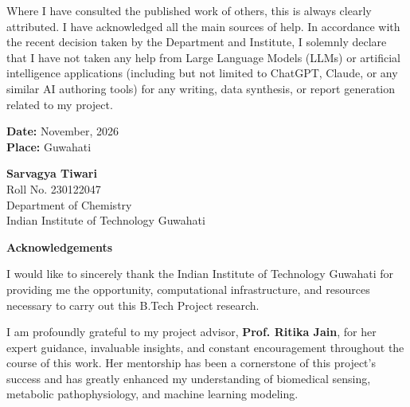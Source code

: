 \documentclass[12pt,a4paper,oneside]{report}
\begin{document}
\vspace{0.5cm}
\noindent
Where I have consulted the published work of others, this is always clearly attributed. I have acknowledged all the main sources of help. In accordance with the recent decision taken by the Department and Institute, I solemnly declare that I have not taken any help from Large Language Models (LLMs) or artificial intelligence applications (including but not limited to ChatGPT, Claude, or any similar AI authoring tools) for any writing, data synthesis, or report generation related to my project.

\vspace{3.5cm}

\noindent
\begin{minipage}[t]{0.5\textwidth}
    \textbf{Date:} November, 2026\\
    \textbf{Place:} Guwahati
\end{minipage}
\hfill
\begin{minipage}[t]{0.45\textwidth}
    \raggedleft
    \textbf{Sarvagya Tiwari}\\
    Roll No. 230122047\\
    Department of Chemistry\\
    Indian Institute of Technology Guwahati
\end{minipage}

\normalsize
\newpage

\thispagestyle{plain}
\begin{center}
    {\huge \textbf{Acknowledgements}}\\[1.2cm]
\end{center}

\noindent
\large
I would like to sincerely thank the Indian Institute of Technology Guwahati for providing me the opportunity, computational infrastructure, and resources necessary to carry out this B.Tech Project research.

\vspace{0.45cm}
\noindent
I am profoundly grateful to my project advisor, \textbf{Prof. Ritika Jain}, for her expert guidance, invaluable insights, and constant encouragement throughout the course of this work. Her mentorship has been a cornerstone of this project's success and has greatly enhanced my understanding of biomedical sensing, metabolic pathophysiology, and machine learning modeling.
\end{document}
